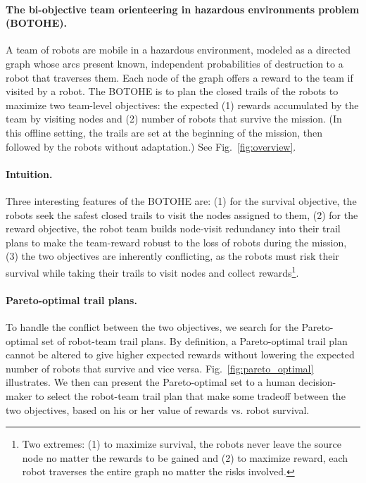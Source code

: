 \documentclass[11pt, oneside]{article}
\begin{document}
\paragraph{The bi-objective team orienteering in hazardous environments problem (BOTOHE).} 
A team of robots are mobile in a hazardous environment, modeled as a directed graph whose arcs present known, independent probabilities of destruction to a robot that traverses them.
Each node of the graph offers a reward to the team if visited by a robot.
The BOTOHE is to plan the closed trails of the robots to maximize two team-level objectives: the expected
(1) rewards accumulated by the team by visiting nodes and
(2) number of robots that survive the mission. 
(In this offline setting, the trails are set at the beginning of the mission, then followed by the robots without adaptation.)
See Fig.~\ref{fig:overview}.

\paragraph{Intuition.} Three interesting features of the BOTOHE are: 
(1) for the survival objective, the robots seek the safest closed trails to visit the nodes assigned to them,
(2) for the reward objective, the robot team builds node-visit redundancy into their trail plans to make the team-reward robust to the loss of robots during the mission,
(3) the two objectives are inherently conflicting, as the robots must risk their survival while taking their trails to visit nodes and collect rewards\footnote{Two extremes: (1) to maximize survival, the robots never leave the source node no matter the rewards to be gained and (2) to maximize reward, each robot traverses the entire graph no matter the risks involved.}.

\paragraph{Pareto-optimal trail plans.}
To handle the conflict between the two objectives, we search for the Pareto-optimal set of robot-team trail plans. By definition, a Pareto-optimal trail plan cannot be altered to give higher expected rewards without lowering the expected number of robots that survive and vice versa. 
Fig.~\ref{fig:pareto_optimal} illustrates.
We then can present the Pareto-optimal set to a human decision-maker to select the robot-team trail plan that make some tradeoff between the two objectives, based on his or her value of rewards vs. robot survival. 
\end{document}
